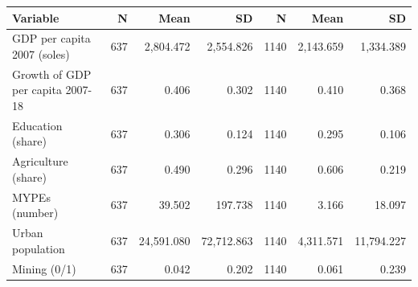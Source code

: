 \begin{tabular}{lrrrrrr}
\hline
Variable & N & Mean & SD & N & Mean & SD \\
\hline
GDP per capita 2007 (soles) & 637 & 2,804.472 & 2,554.826 & 1140 & 2,143.659 & 1,334.389 \\
Growth of GDP per capita 2007-18 & 637 & 0.406 & 0.302 & 1140 & 0.410 & 0.368 \\
Education (share) & 637 & 0.306 & 0.124 & 1140 & 0.295 & 0.106 \\
Agriculture (share) & 637 & 0.490 & 0.296 & 1140 & 0.606 & 0.219 \\
MYPEs (number) & 637 & 39.502 & 197.738 & 1140 & 3.166 & 18.097 \\
Urban population & 637 & 24,591.080 & 72,712.863 & 1140 & 4,311.571 & 11,794.227 \\
Mining (0/1) & 637 & 0.042 & 0.202 & 1140 & 0.061 & 0.239 \\
\hline
\end{tabular}
